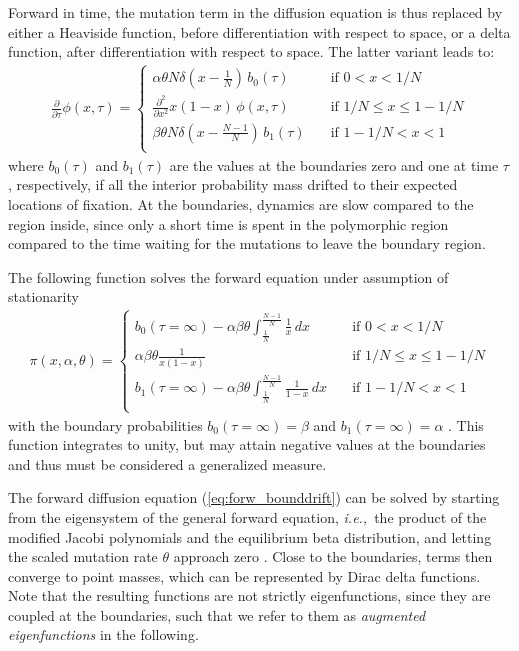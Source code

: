 \documentclass[preprint]{elsarticle}
\newcommand\ie{{\it i.e.,}}
\begin{document}
Forward in time, the mutation term in the diffusion equation is thus replaced by either a Heaviside function, before differentiation with respect to space, or a delta function, after differentiation with respect to space. The latter variant leads to:
\begin{align}\label{eq:forw_bounddrift}
  \frac{\partial}{\partial \tau} \phi(x,\tau) =
  \begin{cases}
    \alpha\theta N\delta(x-\tfrac1N) \,b_0(\tau)  \quad         & \text{if } 0 < x < 1/N         \\
    \frac{\partial^2}{\partial x^2}x(1-x)\,\phi(x,\tau)\, \quad & \text{if } 1/N \le x \le 1-1/N \\
    \beta\theta N\delta(x-\tfrac{N-1}N) \,b_1(\tau)\quad        & \text{if } 1-1/N < x < 1       \\
\end{cases}
\end{align}
where $b_0(\tau)$ and $b_1(\tau)$ are the values at the boundaries zero and one at time $\tau$, respectively, if all the interior probability mass drifted to their expected locations of fixation. At the boundaries, dynamics are slow compared to the region inside, since only a short time is spent in the polymorphic region compared to the time waiting for the mutations to leave the boundary region. 

The following function solves the forward equation under assumption of stationarity
\begin{align}\label{eq:forw_bounddrift-stat}
  \pi(x, \alpha, \theta) =
  \begin{cases}
    b_0(\tau=\infty)-\alpha\beta\theta \int_{\tfrac1N}^{\tfrac{N-1}N} \frac1x\,dx \quad     & \text{if } 0 < x < 1/N         \\
    \alpha\beta\theta\frac{1}{x(1-x)} \quad                                                 & \text{if } 1/N \le x \le 1-1/N \\
    b_1(\tau=\infty)-\alpha\beta\theta \int_{\tfrac1N}^{\tfrac{N-1}N} \frac1{1-x}\,dx \quad & \text{if } 1-1/N < x < 1       \\
\end{cases}
\end{align}
with the boundary probabilities $b_0(\tau=\infty)=\beta$ and $b_1(\tau=\infty)=\alpha$ \citep{Vogl15,Vogl16}. This function integrates to unity, but may attain negative values at the boundaries and thus must be considered a generalized measure. 

The forward diffusion equation (\ref{eq:forw_bounddrift}) can be solved by starting from the eigensystem of the general forward equation, \ie\ the product of the modified Jacobi polynomials \citep{Song12} and the equilibrium beta distribution, and letting the scaled mutation rate $\theta$ approach zero \citep[][Appendix A.1]{Vogl15}. Close to the boundaries, terms then converge to point masses, which can be represented by Dirac delta functions. Note that the resulting functions are not strictly eigenfunctions, since they are coupled at the boundaries, such that we refer to them as \textit{augmented eigenfunctions} in the following. 
\end{document}
